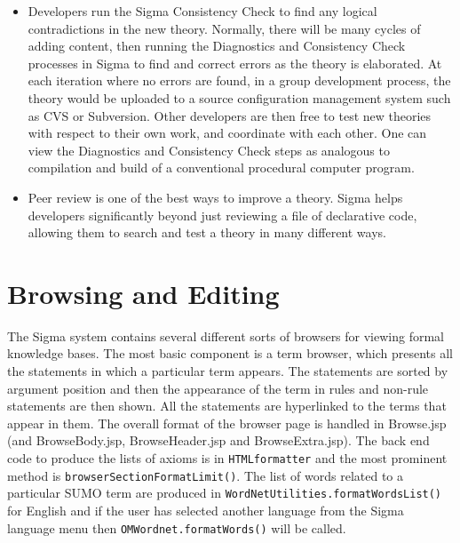\documentclass{book}
\begin{document}
\begin{itemize}
\item Developers run the Sigma Consistency Check to
find any logical contradictions in the new theory.   Normally, there will be
many cycles of adding content, then running the Diagnostics and Consistency
Check processes in Sigma to find and correct errors as the theory is elaborated.
At each iteration where no errors are found, in a group development process, the
theory would be uploaded to a source configuration management system such as
CVS or Subversion. Other developers are then free
to test new theories with respect to their own work, and coordinate with each
other.  One can view the Diagnostics and Consistency Check steps as analogous to
compilation and build of a conventional procedural computer program.

\item {}Peer review is one of the best ways to improve a
theory. Sigma helps developers significantly beyond just reviewing a file of
declarative code, allowing them to search and test a theory in many different
ways.

\end{itemize}

\section{Browsing and Editing}
\label{chap:KnowEngi:sec:BrowEdit}

The Sigma system contains several different sorts of browsers for viewing formal
knowledge bases. The most basic component is a term browser, which presents all
the statements in which a particular term appears. The statements are sorted by
argument position and then the appearance of the term in rules and non-rule
statements are then shown. All the statements are hyperlinked to the terms that
appear in them.  The overall format of the browser page is handled in Browse.jsp
(and BrowseBody.jsp, BrowseHeader.jsp and BrowseExtra.jsp).  The back end code
to produce the lists of axioms is in
\texttt{HTMLformatter} and the most prominent
method is \texttt{browserSectionFormatLimit()}.  The list of words related to a
particular SUMO term are produced in
\texttt{WordNetUtilities.formatWordsList()} for
English and if the user has selected another language from the Sigma language menu
then \texttt{OMWordnet.formatWords()} will be called.
\end{document}
